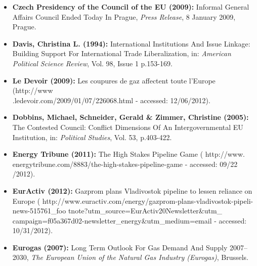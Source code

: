 \documentclass[11pt,a4paper,english]{scrreprt}
\begin{document}
\begin{itemize}
	\item [\Rectsteel] \textbf{Czech Presidency of the Council of the EU
(2009):} Informal General Affairs Council Ended Today In Prague, \textsl{Press
Release}, 8 January 2009, Prague.

	

	\item [\Rectsteel] \textbf{Davis, Christina L. (1994):} International
Institutions And Issue Linkage: Building Support For International Trade
Liberalization, in: \textsl{American Political Science Review}, Vol. 98, Issue 1
p.153-169.



\item [\Rectsteel] \textbf{Le Devoir (2009):} Les coupures de gaz affectent
toute l'Europe (\textcolor{dunkelgrau.80}{http://www\\
.ledevoir.com/2009/01/07/226068.html} - accessed: 12/06/2012).

	

	\item [\Rectsteel] \textbf{Dobbins, Michael, Schneider, Gerald \&
Zimmer, Christine (2005):} The Contested Council: Conflict Dimensions Of An
Intergovernmental EU Institution, in: \textsl{Political Studies}, Vol. 53,
p.403-422.



\item [\Rectsteel] \textbf{Energy Tribune (2011):} The High Stakes Pipeline
Game (\textcolor{dunkelgrau.80}{
http://www.\\
energytribune.com/8883/the-high-stakes-pipeline-game} - accessed: 09/22\\
/2012).



\item [\Rectsteel] \textbf{EurActiv (2012):} Gazprom plans Vladivostok pipeline
to lessen reliance on Europe (\textcolor{dunkelgrau.80}{
http://www.euractiv.com/energy/gazprom-plans-vladivostok-pipeli-news-515761\_foo
tnote{?}utm\_source=EurActiv\textdiscount20Newsletter\&utm\_\\
campaign=f05a367d02-newsletter\_energy\&utm\_medium=email} - accessed:
10/31/2012).



	\item [\Rectsteel] \textbf{Eurogas (2007):} Long Term Outlook For Gas
Demand And Supply 2007--2030, \textsl{The European Union of the Natural Gas
Industry (Eurogas)}, Brussels.




\end{itemize}
\end{document}
